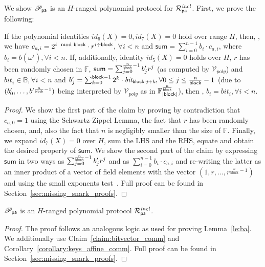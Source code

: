 \noindent We show $\mathscr{P}_{\mathsf{pa}}$ is an $H$-ranged polynomial protocol 
for $\mathcal{R}^{\mathit{incl}}_{\mathsf{pa}}$. First, we prove the following:

\begin{test_claim}
\label{claim:bitvector_comm}
If the polynomial identities $id_6(X) = 0, id_7(X) = 0$ hold over range $H$, then, 
\ewnp, 
we have $c_{a,i} =  2^{i \mod {\mathsf{block}}} \cdot r^{i \div \mathsf{block}}$, $\forall i < n$ and $\mathsf{sum} = \sum_{i=0}^{n-1}b_i \cdot c_{a,i}$, 
where $b_i = b(\omega^i), \forall i <n$. If, additionally, identity $id_5(X) = 0$ holds over $H$, 
$r$ has been randomly chosen in $\mathbb{F}$, $\mathsf{sum} = \sum_{j=0}^{\frac{n}{\mathsf{block}}-1} b'_{j}r^j$ 
(as computed by $\mathcal{V}_{poly}$) and $\mathit{bit_{i}} \in \mathbb{B}, \forall i < n$ and 
$b'_{j} = \sum_{k=0}^{\mathsf{block} -1}2^k \cdot \mathit{bit_{\mathsf{block} \cdot j + k}}, \forall 0 \leq j \leq \frac{n}{\mathsf{block}} -1$ 
(due to  $(b'_{0}, \ldots, b'^{\frac{n}{\mathsf{block}} -1})$ 
being interpreted by $\mathcal{V}_{poly}$ as in $\mathbb{F}_{|\mathsf{block}|}^{\frac{n}{\mathsf{block}}}$), then \ewnp, 
$b_i = \mathit{bit_{i}}, \forall i <n$.
\end{test_claim}
\vspace{-0.15in}

\begin{proof}
We show the first part of the claim by proving by contradiction that $c_{a,0} =1$ using the Schwartz-Zippel Lemma, the fact that $r$ has been 
randomly chosen, and, also the fact that $n$ is negligibly smaller than the size of $\mathbb{F}$. Finally, we expand $\mathit{id_7}(X) = 0$ 
over $H$, sum the LHS and the RHS, equate and obtain the desired property of $\mathsf{sum}$. We show the second part of 
the claim by expressing $\mathsf{sum}$ in two ways as $\sum_{j=0}^{\frac{n}{\mathsf{block}}-1} b'_{j}r^j $ and as $\sum_{i=0}^{n-1} b_i \cdot c_{a,i}$ and re-writing the 
latter as an inner product of a vector of field elements with the vector $(1, r, \ldots, r^{\frac{n}{\mathsf{block}}-1})$ and using the small exponents test~\cite{small_exponents}. 
Full proof can be found in Section~\ref{sec:missing_snark_proofs}.
\end{proof}
\vspace{-0.1in}

\begin{lemma} 
$\mathscr{P}_{\mathsf{pa}}$ is an $H$-ranged polynomial protocol $\mathcal{R}^{\mathit{incl}}_{\mathsf{pa}}$.
\end{lemma}
\vspace{-0.15in}

\begin{proof} 
The proof follows an analogous logic as used for proving Lemma~\ref{le:ba}. We additionally use 
Claim~\ref{claim:bitvector_comm} and Corollary~\ref{corollary:keys_affine_comm}. Full proof can be found in Section~\ref{sec:missing_snark_proofs}.
\end{proof}
\vspace{-0.15in}
